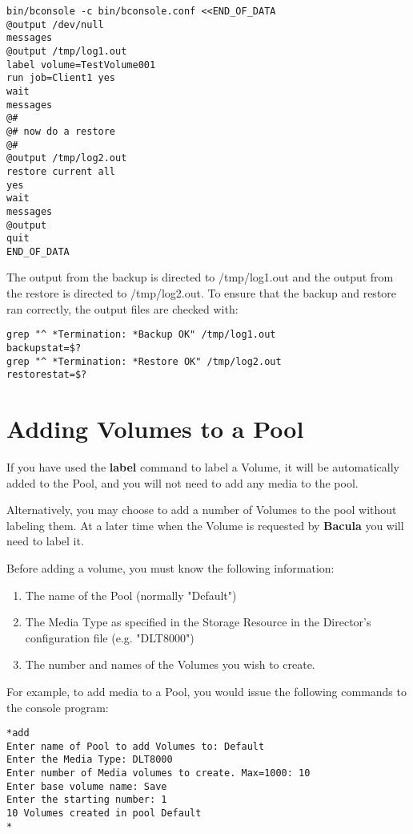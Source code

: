 \footnotesize
\begin{verbatim}
bin/bconsole -c bin/bconsole.conf <<END_OF_DATA
@output /dev/null
messages
@output /tmp/log1.out
label volume=TestVolume001
run job=Client1 yes
wait
messages
@#
@# now do a restore
@#
@output /tmp/log2.out
restore current all
yes
wait
messages
@output
quit
END_OF_DATA
\end{verbatim}
\normalsize

The output from the backup is directed to /tmp/log1.out and the output from
the restore is directed to /tmp/log2.out. To ensure that the backup and
restore ran correctly, the output files are checked with:

\footnotesize
\begin{verbatim}
grep "^ *Termination: *Backup OK" /tmp/log1.out
backupstat=$?
grep "^ *Termination: *Restore OK" /tmp/log2.out
restorestat=$?
\end{verbatim}
\normalsize

\section{Adding Volumes to a Pool}

If you have used the {\bf label} command to label a Volume, it will be
automatically added to the Pool, and you will not need to add any media to the
pool.

Alternatively, you may choose to add a number of Volumes to the pool without
labeling them. At a later time when the Volume is requested by {\bf Bacula}
you will need to label it.

Before adding a volume, you must know the following information:

\begin{enumerate}
\item The name of the Pool (normally "Default")
\item The Media Type as specified in the Storage Resource  in the Director's
   configuration file (e.g. "DLT8000")
\item The number and names of the Volumes you wish to create.
\end{enumerate}

For example, to add media to a Pool, you would issue the following commands to
the console program:

\footnotesize
\begin{verbatim}
*add
Enter name of Pool to add Volumes to: Default
Enter the Media Type: DLT8000
Enter number of Media volumes to create. Max=1000: 10
Enter base volume name: Save
Enter the starting number: 1
10 Volumes created in pool Default
*
\end{verbatim}
\normalsize

